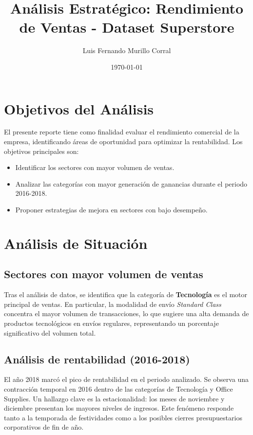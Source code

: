 \documentclass[12pt,a4paper]{article}
\title{\textbf{Análisis Estratégico: Rendimiento de Ventas - Dataset Superstore}}
\author{Luis Fernando Murillo Corral}
\date{\today}
\begin{document}
\maketitle

\section{Objetivos del Análisis}
El presente reporte tiene como finalidad evaluar el rendimiento comercial de la empresa, identificando áreas de oportunidad para optimizar la rentabilidad. Los objetivos principales son:
\begin{itemize}[noitemsep]
    \item Identificar los sectores con mayor volumen de ventas.
    \item Analizar las categorías con mayor generación de ganancias durante el periodo 2016-2018.
    \item Proponer estrategias de mejora en sectores con bajo desempeño.
\end{itemize}

\section{Análisis de Situación}

\subsection{Sectores con mayor volumen de ventas}
Tras el análisis de datos, se identifica que la categoría de \textbf{Tecnología} es el motor principal de ventas. En particular, la modalidad de envío \textit{Standard Class} concentra el mayor volumen de transacciones, lo que sugiere una alta demanda de productos tecnológicos en envíos regulares, representando un porcentaje significativo del volumen total.

\subsection{Análisis de rentabilidad (2016-2018)}
El año 2018 marcó el pico de rentabilidad en el periodo analizado. Se observa una contracción temporal en 2016 dentro de las categorías de Tecnología y Office Supplies. Un hallazgo clave es la estacionalidad: los meses de noviembre y diciembre presentan los mayores niveles de ingresos. Este fenómeno responde tanto a la temporada de festividades como a los posibles cierres presupuestarios corporativos de fin de año.
\end{document}
